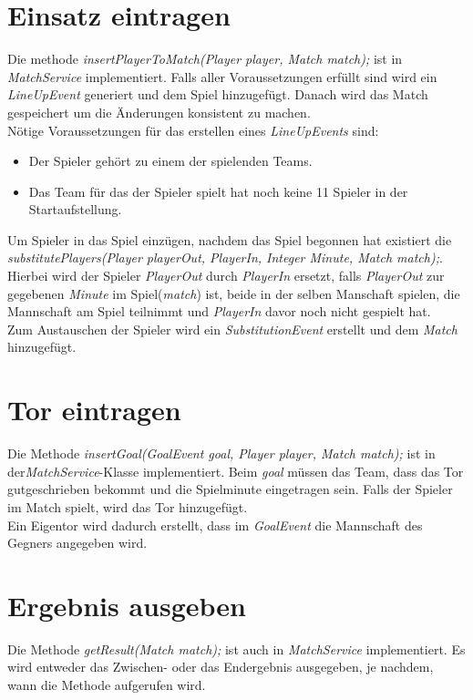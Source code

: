 \documentclass[11pt,german]{scrartcl}
\begin{document}
\section{Einsatz eintragen}
Die methode {\it insertPlayerToMatch(Player player, Match match);} ist in {\it MatchService} implementiert. Falls aller Voraussetzungen erfüllt sind wird ein {\it LineUpEvent} generiert und dem Spiel hinzugefügt. Danach wird das Match gespeichert um die Änderungen konsistent zu machen.\\
Nötige Voraussetzungen für das erstellen eines {\it LineUpEvents} sind:\\
\begin{itemize}
	\item Der Spieler gehört zu einem der spielenden Teams.
	\item Das Team für das der Spieler spielt hat noch keine 11 Spieler in der Startaufstellung.
\end{itemize}
Um Spieler in das Spiel einzügen, nachdem das Spiel begonnen hat existiert die {\it substitutePlayers(Player playerOut, PlayerIn, Integer Minute, Match match);}. Hierbei wird der Spieler {\it PlayerOut} durch {\it PlayerIn} ersetzt, falls {\it PlayerOut} zur gegebenen {\it Minute} im Spiel({\it match}) ist, beide in der selben Manschaft spielen, die Mannschaft am Spiel teilnimmt und {\it PlayerIn} davor noch nicht gespielt hat.\\
Zum Austauschen der Spieler wird ein {\it SubstitutionEvent} erstellt und dem {\it Match} hinzugefügt.

\section{Tor eintragen}
Die Methode {\it insertGoal(GoalEvent goal, Player player, Match match);} ist in der{\it MatchService}-Klasse implementiert. Beim {\it goal} müssen das Team, dass das Tor gutgeschrieben bekommt und die Spielminute eingetragen sein. Falls der Spieler im Match spielt, wird das Tor hinzugefügt.\\
Ein Eigentor wird dadurch erstellt, dass im {\it GoalEvent} die Mannschaft des Gegners angegeben wird.

\section{Ergebnis ausgeben}
Die Methode {\it getResult(Match match);} ist auch in {\it MatchService} implementiert. Es wird entweder das Zwischen- oder das Endergebnis ausgegeben, je nachdem, wann die Methode aufgerufen wird.
\end{document}

